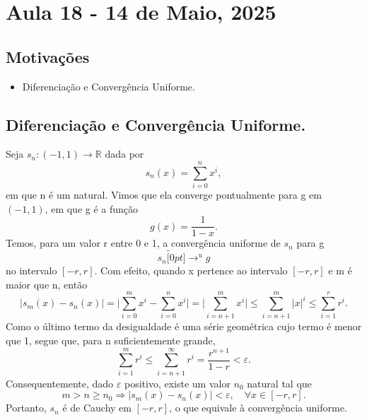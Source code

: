 \documentclass[../analysisII_notes.tex]{subfiles}
\begin{document}
\section{Aula 18 - 14 de Maio, 2025}
\subsection{Motivações}
\begin{itemize}
	\item Diferenciação e Convergência Uniforme.
\end{itemize}
\subsection{Diferenciação e Convergência Uniforme.}
\begin{example}
	Seja \(s_{n}:(-1, 1)\rightarrow \mathbb{R}\) dada por
	\[
		s_{n}(x) = \sum\limits_{i=0}^{n}x^{i},
	\]
	em que n é um natural. Vimos que ela converge pontualmente para g em \((-1, 1)\), em que g é a função
	\[
		g(x) = \frac{1}{1-x}.
	\]
	Temos, para um valor r entre 0 e 1, a convergência uniforme de \(s_{n}\) para g
	\[
		s_{n}\overbracket[0pt]{\longrightarrow}^{u}g
	\]
	no intervalo \([-r, r]\). Com efeito, quando x pertence ao intervalo \([-r, r]\) e m é maior que n, então
	\[
		|s_{m}(x)-s_{n}(x)| = \biggl\vert \sum\limits_{i=0}^{m}x^{i}-\sum\limits_{i=0}^{n}x^{i} \biggr\vert = \biggl\vert \sum\limits_{i=n+1}^{m}x^{i} \biggr\vert \leq \sum\limits_{i=n+1}^{m}|x|^{i} \leq \sum\limits_{i=1}^{r}r^{i}.
	\]
	Como o último termo da desigualdade é uma série geométrica cujo termo é menor que 1, segue que, para n suficientemente grande,
	\[
		\sum\limits_{i=1}^{m}r^{i}\leq \sum\limits_{i=n+1}^{\infty}r^{i} = \frac{r^{n+1}}{1-r} < \varepsilon.
	\]
	Consequentemente, dado \(\varepsilon \) positivo, existe um valor \(n_{0}\) natural tal que
	\[
		m>n\geq n_{0}\Rightarrow |s_{m}(x)-s_{n}(x)| < \varepsilon , \quad \forall x\in [-r, r].
	\]
	Portanto, \(s_{n}\) é de Cauchy em \([-r, r]\), o que equivale à convergência uniforme.


\end{example}
\end{document}
